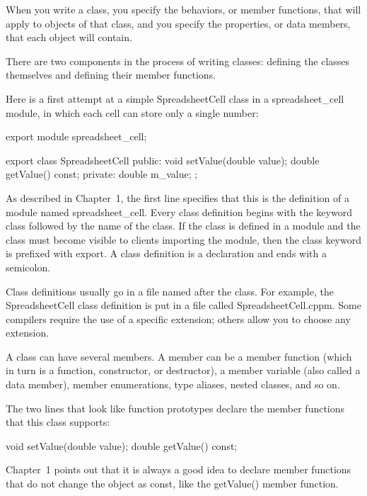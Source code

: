 
When you write a class, you specify the behaviors, or member functions, that will apply to objects of that class, and you specify the properties, or data members, that each object will contain.

There are two components in the process of writing classes: defining the classes themselves and defining their member functions.



Here is a first attempt at a simple SpreadsheetCell class in a spreadsheet\_cell module, in which each cell can store only a single number:

\begin{cpp}
export module spreadsheet_cell;

export class SpreadsheetCell
{
    public:
        void setValue(double value);
        double getValue() const;
    private:
        double m_value;
};
\end{cpp}

As described in Chapter 1, the first line specifies that this is the definition of a module named spreadsheet\_cell. Every class definition begins with the keyword class followed by the name of the class. If the class is defined in a module and the class must become visible to clients importing the module, then the class keyword is prefixed with export. A class definition is a declaration and ends with a semicolon.

Class definitions usually go in a file named after the class. For example, the SpreadsheetCell class definition is put in a file called SpreadsheetCell.cppm. Some compilers require the use of a specific extension; others allow you to choose any extension.


A class can have several members. A member can be a member function (which in turn is a function, constructor, or destructor), a member variable (also called a data member), member enumerations, type aliases, nested classes, and so on.

The two lines that look like function prototypes declare the member functions that this class supports:

\begin{cpp}
void setValue(double value);
double getValue() const;
\end{cpp}

Chapter 1 points out that it is always a good idea to declare member functions that do not change the object as const, like the getValue() member function.

